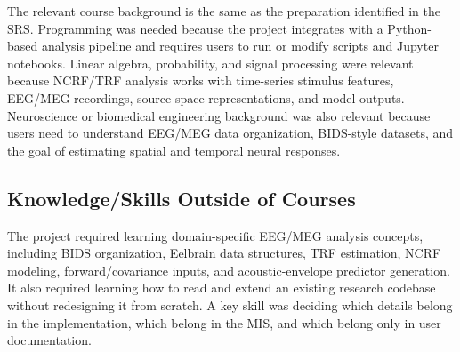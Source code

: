 \documentclass{article}
\begin{document}

The relevant course background is the same as the preparation identified in the SRS. Programming was needed because the project integrates with a Python-based analysis pipeline and requires users to run or modify scripts and Jupyter notebooks. Linear algebra, probability, and signal processing were relevant because NCRF/TRF analysis works with time-series stimulus features, EEG/MEG recordings, source-space representations, and model outputs. Neuroscience or biomedical engineering background was also relevant because users need to understand EEG/MEG data organization, BIDS-style datasets, and the goal of estimating spatial and temporal neural responses.

\subsection{Knowledge/Skills Outside of Courses}


The project required learning domain-specific EEG/MEG analysis concepts, including BIDS organization, Eelbrain data structures, TRF estimation, NCRF modeling, forward/covariance inputs, and acoustic-envelope predictor generation. It also required learning how to read and extend an existing research codebase without redesigning it from scratch. A key skill was deciding which details belong in the implementation, which belong in the MIS, and which belong only in user documentation.
\end{document}
